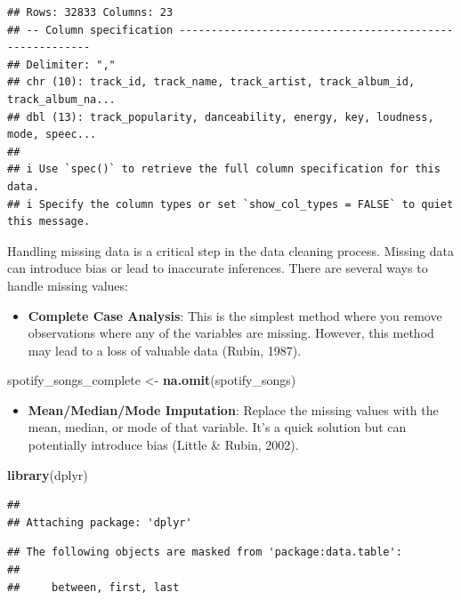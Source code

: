 \documentclass[
  b5paper]{book}
\newenvironment{Shaded}{\begin{snugshade}}{\end{snugshade}}
\newcommand{\FunctionTok}[1]{\textcolor[rgb]{0.13,0.29,0.53}{\textbf{#1}}}
\newcommand{\NormalTok}[1]{#1}
\newcommand{\OtherTok}[1]{\textcolor[rgb]{0.56,0.35,0.01}{#1}}
\providecommand{\tightlist}{%
  \setlength{\itemsep}{0pt}\setlength{\parskip}{0pt}}
\begin{document}
\begin{verbatim}
## Rows: 32833 Columns: 23
## -- Column specification --------------------------------------------------------
## Delimiter: ","
## chr (10): track_id, track_name, track_artist, track_album_id, track_album_na...
## dbl (13): track_popularity, danceability, energy, key, loudness, mode, speec...
## 
## i Use `spec()` to retrieve the full column specification for this data.
## i Specify the column types or set `show_col_types = FALSE` to quiet this message.
\end{verbatim}

Handling missing data is a critical step in the data cleaning process. Missing data can introduce bias or lead to inaccurate inferences. There are several ways to handle missing values:

\begin{itemize}
\tightlist
\item
  \textbf{Complete Case Analysis}: This is the simplest method where you remove observations where any of the variables are missing. However, this method may lead to a loss of valuable data (Rubin, 1987).
\end{itemize}

\begin{Shaded}
\begin{Highlighting}[]
\NormalTok{spotify\_songs\_complete }\OtherTok{\textless{}{-}} \FunctionTok{na.omit}\NormalTok{(spotify\_songs)}
\end{Highlighting}
\end{Shaded}

\begin{itemize}
\tightlist
\item
  \textbf{Mean/Median/Mode Imputation}: Replace the missing values with the mean, median, or mode of that variable. It's a quick solution but can potentially introduce bias (Little \& Rubin, 2002).
\end{itemize}

\begin{Shaded}
\begin{Highlighting}[]
\FunctionTok{library}\NormalTok{(dplyr)}
\end{Highlighting}
\end{Shaded}

\begin{verbatim}
## 
## Attaching package: 'dplyr'
\end{verbatim}

\begin{verbatim}
## The following objects are masked from 'package:data.table':
## 
##     between, first, last
\end{verbatim}
\end{document}
